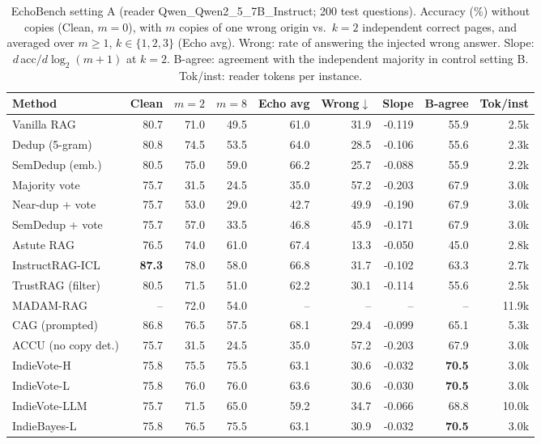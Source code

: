 \begin{table}[tbp]
\centering
\small
\caption{EchoBench setting A (reader Qwen\_Qwen2\_5\_7B\_Instruct; 200 test questions). Accuracy (\%) without copies (Clean, $m{=}0$), with $m$ copies of one wrong origin vs.\ $k{=}2$ independent correct pages, and averaged over $m\geq1$, $k\in\{1,2,3\}$ (Echo avg). Wrong: rate of answering the injected wrong answer. Slope: $d\,$acc$/d\log_2(m{+}1)$ at $k{=}2$. B-agree: agreement with the independent majority in control setting B. Tok/inst: reader tokens per instance.}
\label{tab:main}
\setlength{\tabcolsep}{4pt}
\begin{tabular}{lrrrrrrrr}
\toprule
Method & Clean & $m{=}2$ & $m{=}8$ & Echo avg & Wrong$\downarrow$ & Slope & B-agree & Tok/inst \\
\midrule
Vanilla RAG & 80.7 & 71.0 & 49.5 & 61.0 & 31.9 & -0.119 & 55.9 & 2.5k \\
Dedup (5-gram) & 80.8 & 74.5 & 53.5 & 64.0 & 28.5 & -0.106 & 55.6 & 2.3k \\
SemDedup (emb.) & 80.5 & 75.0 & 59.0 & 66.2 & 25.7 & -0.088 & 55.9 & 2.2k \\
Majority vote & 75.7 & 31.5 & 24.5 & 35.0 & 57.2 & -0.203 & 67.9 & 3.0k \\
Near-dup + vote & 75.7 & 53.0 & 29.0 & 42.7 & 49.9 & -0.190 & 67.9 & 3.0k \\
SemDedup + vote & 75.7 & 57.0 & 33.5 & 46.8 & 45.9 & -0.171 & 67.9 & 3.0k \\
Astute RAG & 76.5 & 74.0 & 61.0 & 67.4 & 13.3 & -0.050 & 45.0 & 2.8k \\
InstructRAG-ICL & \textbf{87.3} & 78.0 & 58.0 & 66.8 & 31.7 & -0.102 & 63.3 & 2.7k \\
TrustRAG (filter) & 80.5 & 71.5 & 51.0 & 62.2 & 30.1 & -0.114 & 55.6 & 2.5k \\
MADAM-RAG & -- & 72.0 & 54.0 & -- & -- & -- & -- & 11.9k \\
CAG (prompted) & 86.8 & 76.5 & 57.5 & 68.1 & 29.4 & -0.099 & 65.1 & 5.3k \\
ACCU (no copy det.) & 75.7 & 31.5 & 24.5 & 35.0 & 57.2 & -0.203 & 67.9 & 3.0k \\
\midrule
IndieVote-H & 75.8 & 75.5 & 75.5 & 63.1 & 30.6 & -0.032 & \textbf{70.5} & 3.0k \\
IndieVote-L & 75.8 & 76.0 & 76.0 & 63.6 & 30.6 & -0.030 & \textbf{70.5} & 3.0k \\
IndieVote-LLM & 75.7 & 71.5 & 65.0 & 59.2 & 34.7 & -0.066 & 68.8 & 10.0k \\
IndieBayes-L & 75.8 & 76.5 & 75.5 & 63.1 & 30.9 & -0.032 & \textbf{70.5} & 3.0k \\

\end{tabular}
\end{table}
